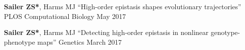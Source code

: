 

\begin{cvpublications}

  \cvpublication
    {\textbf{Sailer ZS*}, Harms MJ} %
    {``High-order epistasis shapes evolutionary trajectories''} %
    {PLOS Computational Biology} %
    {May 2017} %

  \cvpublication
    {\textbf{Sailer ZS*}, Harms MJ} %
    {``Detecting high-order epistasis in nonlinear genotype-phenotype maps''} %
    {Genetics} %
    {March 2017} %

\end{cvpublications}
